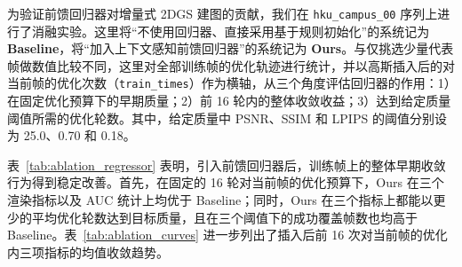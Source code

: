 为验证前馈回归器对增量式 2DGS 建图的贡献，我们在 \texttt{hku\_campus\_00} 序列上进行了消融实验。这里将“不使用回归器、直接采用基于规则初始化”的系统记为 \textbf{Baseline}，将“加入上下文感知前馈回归器”的系统记为 \textbf{Ours}。与仅挑选少量代表帧做数值比较不同，这里对全部训练帧的优化轨迹进行统计，并以高斯插入后的对当前帧的优化次数（\texttt{train\_times}）作为横轴，从三个角度评估回归器的作用：1）在固定优化预算下的早期质量；2）前 16 轮内的整体收敛收益；3）达到给定质量阈值所需的优化轮数。其中，给定质量中 PSNR、SSIM 和 LPIPS 的阈值分别设为 25.0、0.70 和 0.18。

\begin{table}[!t]
\centering
\caption{前馈回归器消融实验结果（\texttt{hku\_campus\_00}）。统计基于全部训练帧的优化轨迹：前两行给出 16 轮优化时的 mean $\pm$ std；中两行为前 16 轮的 AUC；后两行为达到指定质量阈值所需优化轮数的 mean $\pm$ std，括号中给出成功达到阈值的帧数。}
\label{tab:ablation_regressor}
\renewcommand{\arraystretch}{1.18}
\end{table}

表~\ref{tab:ablation_regressor} 表明，引入前馈回归器后，训练帧上的整体早期收敛行为得到稳定改善。首先，在固定的 16 轮对当前帧的优化预算下，Ours 在三个渲染指标以及 AUC 统计上均优于 Baseline；同时，Ours 在三个指标上都能以更少的平均优化轮数达到目标质量，且在三个阈值下的成功覆盖帧数也均高于 Baseline。表~\ref{tab:ablation_curves} 进一步列出了插入后前 16 次对当前帧的优化内三项指标的均值收敛趋势。

